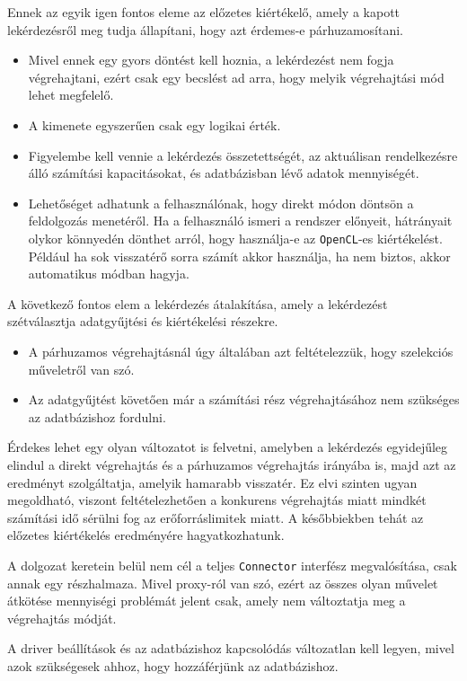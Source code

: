 Ennek az egyik igen fontos eleme az előzetes kiértékelő, amely a kapott lekérdezésről meg tudja állapítani, hogy azt érdemes-e párhuzamosítani.
\begin{itemize}
	\item Mivel ennek egy gyors döntést kell hoznia, a lekérdezést nem fogja végrehajtani, ezért csak egy becslést ad arra, hogy melyik végrehajtási mód lehet megfelelő.
	\item A kimenete egyszerűen csak egy logikai érték.
	\item Figyelembe kell vennie a lekérdezés összetettségét, az aktuálisan rendelkezésre álló számítási kapacitásokat, és adatbázisban lévő adatok mennyiségét.
	\item Lehetőséget adhatunk a felhasználónak, hogy direkt módon döntsön a feldolgozás menetéről. Ha a felhasználó ismeri a rendszer előnyeit, hátrányait olykor könnyedén dönthet arról, hogy használja-e az \texttt{OpenCL}-es kiértékelést. Például ha sok visszatérő sorra számít akkor használja, ha nem biztos, akkor automatikus módban hagyja.
\end{itemize}

A következő fontos elem a lekérdezés átalakítása, amely a lekérdezést szétválasztja adatgyűjtési és kiértékelési részekre.
\begin{itemize}
	\item A párhuzamos végrehajtásnál úgy általában azt feltételezzük, hogy szelekciós műveletről van szó.
	\item Az adatgyűjtést követően már a számítási rész végrehajtásához nem szükséges az adatbázishoz fordulni.
\end{itemize}

Érdekes lehet egy olyan változatot is felvetni, amelyben a lekérdezés egyidejűleg elindul a direkt végrehajtás és a párhuzamos végrehajtás irányába is, majd azt az eredményt szolgáltatja, amelyik hamarabb visszatér. Ez elvi szinten ugyan megoldható, viszont feltételezhetően a konkurens végrehajtás miatt mindkét számítási idő sérülni fog az erőforráslimitek miatt. A későbbiekben tehát az előzetes kiértékelés eredményére hagyatkozhatunk.


A dolgozat keretein belül nem cél a teljes \texttt{Connector} interfész megvalósítása, csak annak egy részhalmaza. Mivel proxy-ról van szó, ezért az összes olyan művelet átkötése mennyiségi problémát jelent csak, amely nem változtatja meg a végrehajtás módját.

A driver beállítások és az adatbázishoz kapcsolódás változatlan kell legyen, mivel azok szükségesek ahhoz, hogy hozzáférjünk az adatbázishoz.

